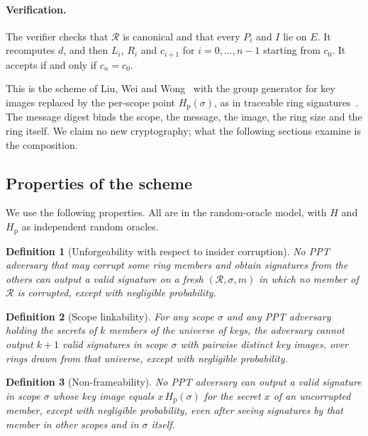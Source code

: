 \documentclass[11pt]{article}
\newtheorem{definition}{Definition}
\theoremstyle{remark}
\newcommand{\Hp}{H_{\mathrm{p}}}
\newcommand{\Hs}{H}
\newcommand{\Ring}{\mathcal{R}}
\begin{document}
\paragraph{Verification.} The verifier checks that $\Ring$ is canonical and that every $P_i$ and $I$ lie on $E$. It recomputes $d$, and then $L_i$, $R_i$ and $c_{i+1}$ for $i=0,\ldots,n-1$ starting from $c_0$. It accepts if and only if $c_n = c_0$.

This is the scheme of Liu, Wei and Wong~\cite{lww04} with the group generator for key images replaced by the per-scope point $\Hp(\sigma)$, as in traceable ring signatures~\cite{fs07}. The message digest binds the scope, the message, the image, the ring size and the ring itself. We claim no new cryptography; what the following sections examine is the composition.

\subsection{Properties of the scheme}\label{sec:props}

We use the following properties. All are in the random-oracle model, with $\Hs$ and $\Hp$ as independent random oracles.

\begin{definition}[Unforgeability with respect to insider corruption]
No PPT adversary that may corrupt some ring members and obtain signatures from the others can output a valid signature on a fresh $(\Ring,\sigma,m)$ in which no member of $\Ring$ is corrupted, except with negligible probability.
\end{definition}

\begin{definition}[Scope linkability]
For any scope $\sigma$ and any PPT adversary holding the secrets of $k$ members of the universe of keys, the adversary cannot output $k+1$ valid signatures in scope $\sigma$ with pairwise distinct key images, over rings drawn from that universe, except with negligible probability.
\end{definition}

\begin{definition}[Non-frameability]
No PPT adversary can output a valid signature in scope $\sigma$ whose key image equals $x\,\Hp(\sigma)$ for the secret $x$ of an uncorrupted member, except with negligible probability, even after seeing signatures by that member in other scopes and in $\sigma$ itself.
\end{definition}
\end{document}
